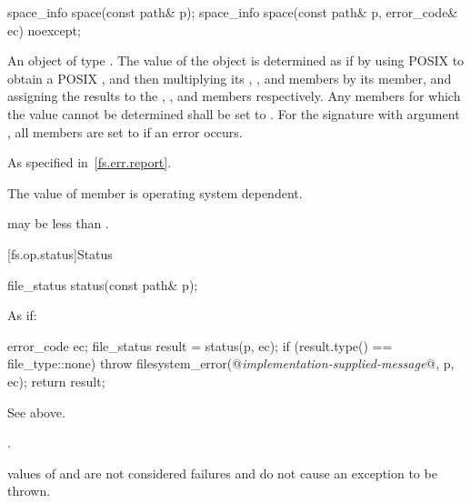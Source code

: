 %
\begin{itemdecl}
space_info space(const path& p);
space_info space(const path& p, error_code& ec) noexcept;
\end{itemdecl}

\begin{itemdescr}
\pnum
\returns An object of type . The value of the 
  object is determined as if by using POSIX 
  to obtain a POSIX ,
  and then multiplying its , ,
  and  members by its  member,
  and assigning the results to the , ,
  and  members respectively. Any members for which the
  value cannot be determined shall be set to .
  For the signature with argument , all members are set to
   if an error occurs.

\pnum
\throws As specified in~\ref{fs.err.report}.

\pnum
\remarks The value of member 
      is operating system dependent. \begin{note}  may be
      less than . \end{note}
\end{itemdescr}


[fs.op.status]{Status}

%
\begin{itemdecl}
file_status status(const path& p);
\end{itemdecl}

\begin{itemdescr}
\pnum
\effects As if:
\begin{codeblock}
error_code ec;
file_status result = status(p, ec);
if (result.type() == file_type::none)
  throw filesystem_error(@\textit{implementation-supplied-message}@, p, ec);
return result;
\end{codeblock}

\pnum
\returns See above.

\pnum
\throws {}.
\begin{note}  values of 
  and  are not considered failures and do not
  cause an exception to be thrown.\end{note}
\end{itemdescr}

